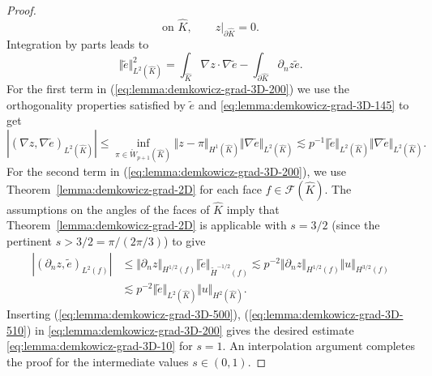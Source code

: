 \documentclass{article}
\begin{document}
\begin{proof}
\[\mbox {on $\widehat K$},\qquad z|_{\partial\widehat{K}}=0.
\]
Integration by parts leads to
\begin{equation}
\Vert\widetilde{e}\Vert_{L^{2}(\widehat{K})}^{2}=\int_{\widehat{K}}\nabla
z\cdot\nabla\widetilde{e}-\int_{\partial\widehat{K}}\partial_{n}%
z\widetilde{e}. \label{eq:lemma:demkowicz-grad-3D-200}%
\end{equation}
For the first term in (\ref{eq:lemma:demkowicz-grad-3D-200}) we use the
orthogonality properties satisfied by $\widetilde{e}$ and \eqref{eq:lemma:demkowicz-grad-3D-145} to get
\begin{equation}
|(\nabla z,\nabla\widetilde{e})_{L^{2}(\widehat{K})}| \leq \operatorname*{inf}_{\pi\in\mathring{W}_{p+1}(\widehat{K})} \Vert z-\pi\Vert_{H^1(\widehat{K})} \Vert\nabla\widetilde{e}\Vert_{L^2(\widehat{K})} \lesssim p^{-1}%
\Vert\widetilde{e}\Vert_{L^{2}(\widehat{K})}\Vert\nabla\widetilde{e}%
\Vert_{L^{2}(\widehat{K})}. \label{eq:lemma:demkowicz-grad-3D-500}%
\end{equation}
For the second term in (\ref{eq:lemma:demkowicz-grad-3D-200}), 
we use Theorem~\ref{lemma:demkowicz-grad-2D} for each face $f \in {\mathcal F}(\widehat K)$. 
The assumptions on the angles of the faces of $\widehat K$ imply that Theorem~\ref{lemma:demkowicz-grad-2D}
is applicable with $s = 3/2$ (since the pertinent $\widehat s > 3/2 = \pi/(2 \pi/3)$) to give
\begin{align}
\label{eq:lemma:demkowicz-grad-3D-510}%
|(\partial_n z,\widetilde{e})_{L^2(f)}| 
&\leq \Vert\partial_n z\Vert_{H^{1/2}(f)} \Vert\widetilde{e}\Vert_{\widetilde{H}^{-1/2}(f)} 
\lesssim p^{-2} \Vert\partial_n z\Vert_{H^{1/2}(f)} \Vert u\Vert_{H^{3/2}(f)}\\
\nonumber 
&\lesssim p^{-2} \Vert\widetilde{e}\Vert_{L^2(\widehat{K})} \Vert u\Vert_{H^2(\widehat{K})}.
\end{align}
Inserting (\ref{eq:lemma:demkowicz-grad-3D-500}), (\ref{eq:lemma:demkowicz-grad-3D-510}) 
in \eqref{eq:lemma:demkowicz-grad-3D-200} gives the desired estimate \eqref{eq:lemma:demkowicz-grad-3D-10} for $s = 1$. 
An interpolation argument completes the proof for the intermediate values $s\in(0,1)$.


\end{proof}
\end{document}
